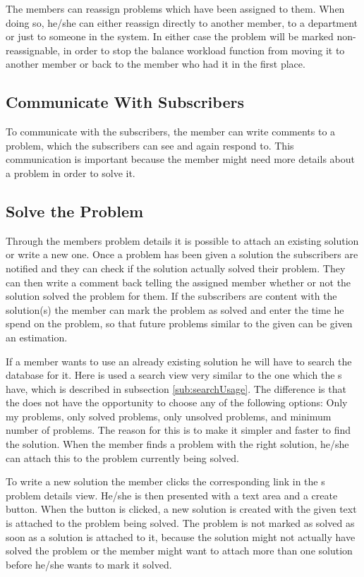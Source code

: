 The \astaff[] members can reassign problems which have been assigned to them.
When doing so, he/she can either reassign directly to another \astaff[] member, to a department or just to someone in the system.
In either case the problem will be marked non-reassignable, in order to stop the balance workload function from moving it to another \astaff[] member or back to the \astaff[] member who had it in the first place.

\subsection{Communicate With Subscribers}
To communicate with the subscribers, the \astaff[] member can write comments to a problem, which the subscribers can see and again respond to.
This communication is important because the \astaff[] member might need more details about a problem in order to solve it.

\subsection{Solve the Problem}
Through the \staff[] members problem details it is possible to attach an existing solution or write a new one.
Once a problem has been given a solution the subscribers are notified and they can check if the solution actually solved their problem.
They can then write a comment back telling the assigned \astaff[] member whether or not the solution solved the problem for them.
If the subscribers are content with the solution(s) the \astaff[] member can mark the problem as solved and enter the time he spend on the problem, so that future problems similar to the given can be given an estimation.

If a \astaff[] member wants to use an already existing solution he will have to search the database for it.
Here is used a search view very similar to the one which the \aclient[]s have, which is described in subsection \ref{sub:searchUsage}.
The difference is that the \astaff[] does not have the opportunity to choose any of the following options: Only my problems, only solved problems, only unsolved problems, and minimum number of problems.
The reason for this is to make it simpler and faster to find the solution.
When the \astaff[] member finds a problem with the right solution, he/she can attach this to the problem currently being solved.

To write a new solution the \astaff[] member clicks the corresponding link in the \astaff[]s problem details view.
He/she is then presented with a text area and a create button.
When the button is clicked, a new solution is created with the given text is attached to the problem being solved.
The problem is not marked as solved as soon as a solution is attached to it, because the solution might not actually have solved the problem or the \astaff[] member might want to attach more than one solution before he/she wants to mark it solved.
